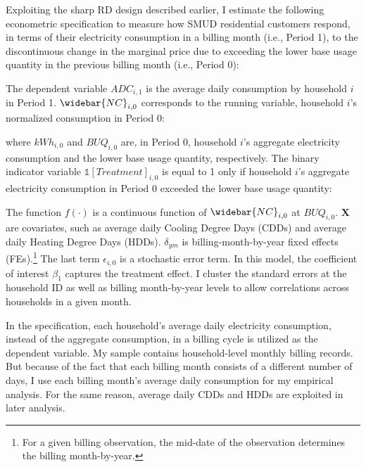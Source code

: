 Exploiting the sharp RD design described earlier, I estimate the following econometric specification to measure how SMUD residential customers respond, in terms of their electricity consumption in a billing month (i.e., Period 1), to the discontinuous change in the marginal price due to exceeding the lower base usage quantity in the previous billing month (i.e., Period 0):

The dependent variable $ADC_{i, 1}$ is the average daily consumption by household $i$ in Period 1. $\widebar{NC}_{i, 0}$ corresponds to the running variable, household $i$'s normalized consumption in Period 0:

where $kWh_{i, 0}$ and $BUQ_{i, 0}$ are, in Period 0, household $i$'s aggregate electricity consumption and the lower base usage quantity, respectively. The binary indicator variable $\mathbb{1}[Treatment]_{i, 0}$ is equal to 1 only if household $i$'s aggregate electricity consumption in Period 0 exceeded the lower base usage quantity:

The function $f\left( \cdot \right)$ is a continuous function of $\widebar{NC}_{i, 0}$ at $BUQ_{i, 0}$. $\boldsymbol{X}$ are covariates, such as average daily Cooling Degree Days (CDDs) and average daily Heating Degree Days (HDDs). $\delta_{ym}$ is billing-month-by-year fixed effects (FEs).\footnote{For a given billing observation, the mid-date of the observation determines the billing month-by-year.} The last term $\epsilon_{i, 0}$ is a stochastic error term. In this model, the coefficient of interest $\beta_{1}$ captures the treatment effect. I cluster the standard errors at the household ID as well as billing month-by-year levels to allow correlations across households in a given month. 

In the specification, each household's average daily electricity consumption, instead of the aggregate consumption, in a billing cycle is utilized as the dependent variable. My sample contains household-level monthly billing records. But because of the fact that each billing month consists of a different number of days, I use each billing month's average daily consumption for my empirical analysis. For the same reason, average daily CDDs and HDDs are exploited in later analysis. 
